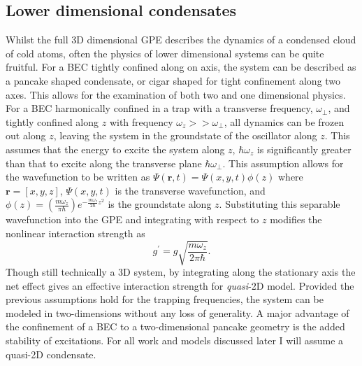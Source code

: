 \subsection{Lower dimensional condensates}\label{sub:coldatom_recent}
Whilst the full 3D dimensional GPE describes the dynamics of a condensed cloud of cold atoms, often the physics of lower dimensional systems can be quite fruitful. For a BEC tightly confined along on axis, the system can be described as a pancake shaped condensate, or cigar shaped for tight confinement along two axes. This allows for the examination of both two and one dimensional physics. For a BEC harmonically confined in a trap with a transverse frequency, $\omega_\perp$, and tightly confined along $z$ with frequency $\omega_z >> \omega_\perp$, all dynamics can be frozen out along $z$, leaving the system in the groundstate of the oscillator along $z$. This assumes that the energy to excite the system along $z$,  $\hbar\omega_z$ is significantly greater than that to excite along the transverse plane $\hbar\omega_\perp$. This assumption allows for the wavefunction to be written as $\Psi(\mathbf{r},t) = \Psi(x,y,t)\phi(z)$ where $\mathbf{r} = [x,y,z]$, $\Psi(x,y,t)$ is the transverse wavefunction, and $\phi(z) = \left(\frac{m\omega_z}{\pi\hbar}\right)e^{-\frac{m\omega_z}{2\hbar}z^2}$ is the groundstate along $z$.
Substituting this separable wavefunction into the GPE and integrating with respect to $z$ modifies the nonlinear interaction strength as
\begin{equation}
    g^{\prime} = g\sqrt{\frac{m\omega_z}{2\pi\hbar}}.
\end{equation}
Though still technically a 3D system, by integrating along the stationary axis the net effect gives an effective interaction strength for \textit{quasi}-2D model. Provided the previous assumptions hold for the trapping frequencies, the system can be modeled in two-dimensions without any loss of generality. A major advantage of the confinement of a BEC to a two-dimensional pancake geometry is the added stability of excitations. For all work and models discussed later I will assume a quasi-2D condensate.
